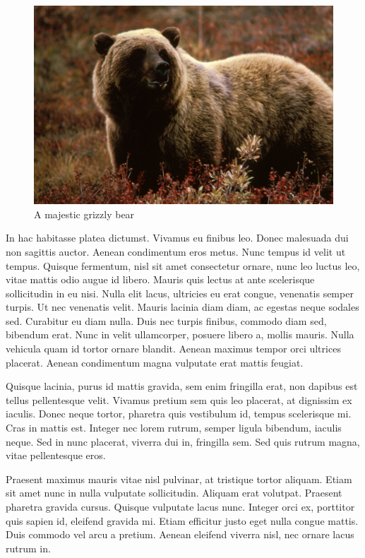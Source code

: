 \documentclass[10pt, a4paper, twocolumn]{article} %
\begin{document}
\begin{figure}
	\includegraphics[width=\linewidth]{bear.jpg} %
	\caption{A majestic grizzly bear} %
	\label{bear} %
\end{figure}

In hac habitasse platea dictumst. Vivamus eu finibus leo. Donec malesuada dui non sagittis auctor. Aenean condimentum eros metus. Nunc tempus id velit ut tempus. Quisque fermentum, nisl sit amet consectetur ornare, nunc leo luctus leo, vitae mattis odio augue id libero. Mauris quis lectus at ante scelerisque sollicitudin in eu nisi. Nulla elit lacus, ultricies eu erat congue, venenatis semper turpis. Ut nec venenatis velit. Mauris lacinia diam diam, ac egestas neque sodales sed. Curabitur eu diam nulla. Duis nec turpis finibus, commodo diam sed, bibendum erat. Nunc in velit ullamcorper, posuere libero a, mollis mauris. Nulla vehicula quam id tortor ornare blandit. Aenean maximus tempor orci ultrices placerat. Aenean condimentum magna vulputate erat mattis feugiat.

Quisque lacinia, purus id mattis gravida, sem enim fringilla erat, non dapibus est tellus pellentesque velit. Vivamus pretium sem quis leo placerat, at dignissim ex iaculis. Donec neque tortor, pharetra quis vestibulum id, tempus scelerisque mi. Cras in mattis est. Integer nec lorem rutrum, semper ligula bibendum, iaculis neque. Sed in nunc placerat, viverra dui in, fringilla sem. Sed quis rutrum magna, vitae pellentesque eros.

Praesent maximus mauris vitae nisl pulvinar, at tristique tortor aliquam. Etiam sit amet nunc in nulla vulputate sollicitudin. Aliquam erat volutpat. Praesent pharetra gravida cursus. Quisque vulputate lacus nunc. Integer orci ex, porttitor quis sapien id, eleifend gravida mi. Etiam efficitur justo eget nulla congue mattis. Duis commodo vel arcu a pretium. Aenean eleifend viverra nisl, nec ornare lacus rutrum in.
\end{document}
